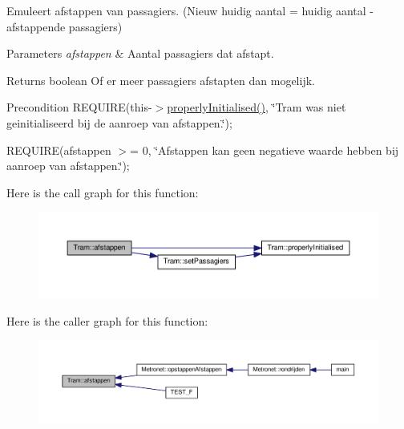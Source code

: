 Emuleert afstappen van passagiers. (Nieuw huidig aantal = huidig aantal -\/ afstappende passagiers) 


\begin{DoxyParams}{Parameters}
{\em afstappen} & Aantal passagiers dat afstapt. \\
\hline
\end{DoxyParams}
\begin{DoxyReturn}{Returns}
boolean Of er meer passagiers afstapten dan mogelijk. 
\end{DoxyReturn}
\begin{DoxyPrecond}{Precondition}
R\+E\+Q\+U\+I\+RE(this-\/$>$\hyperlink{class_tram_a98992eff0453f54fbe64e1f1064169c7}{properly\+Initialised()}, \char`\"{}\+Tram was niet geinitialiseerd bij de aanroep van afstappen.\char`\"{}); 

R\+E\+Q\+U\+I\+RE(afstappen $>$= 0, \char`\"{}\+Afstappen kan geen negatieve waarde hebben bij aanroep van afstappen.\char`\"{}); 
\end{DoxyPrecond}


Here is the call graph for this function\+:
\nopagebreak
\begin{figure}[H]
\begin{center}
\leavevmode
\includegraphics[width=350pt]{class_tram_a81186910caa5212b4a87eec84cd10a46_cgraph}
\end{center}
\end{figure}




Here is the caller graph for this function\+:\nopagebreak
\begin{figure}[H]
\begin{center}
\leavevmode
\includegraphics[width=350pt]{class_tram_a81186910caa5212b4a87eec84cd10a46_icgraph}
\end{center}
\end{figure}


